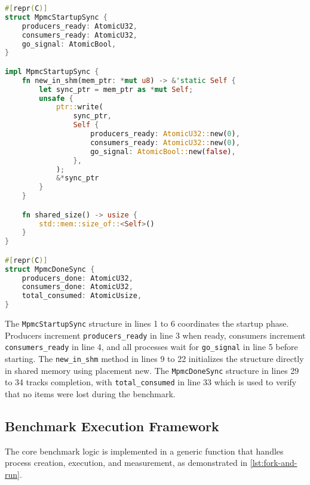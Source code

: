 \begin{lstlisting}[language=Rust, style=boxed, caption={Process synchronization structures}, label={lst:sync-structures}]
#[repr(C)]
struct MpmcStartupSync {
    producers_ready: AtomicU32,
    consumers_ready: AtomicU32,
    go_signal: AtomicBool,
}

impl MpmcStartupSync {
    fn new_in_shm(mem_ptr: *mut u8) -> &'static Self {
        let sync_ptr = mem_ptr as *mut Self;
        unsafe {
            ptr::write(
                sync_ptr,
                Self {
                    producers_ready: AtomicU32::new(0),
                    consumers_ready: AtomicU32::new(0),
                    go_signal: AtomicBool::new(false),
                },
            );
            &*sync_ptr
        }
    }

    fn shared_size() -> usize {
        std::mem::size_of::<Self>()
    }
}

#[repr(C)]
struct MpmcDoneSync {
    producers_done: AtomicU32,
    consumers_done: AtomicU32,
    total_consumed: AtomicUsize,
}
\end{lstlisting}

The \texttt{MpmcStartupSync} structure in lines 1 to 6 coordinates the startup phase. Producers increment \texttt{producers\_ready} in line 3 when ready, consumers increment \texttt{consumers\_ready} in line 4, and all processes wait for \texttt{go\_signal} in line 5 before starting. The \texttt{new\_in\_shm} method in lines 9 to 22 initializes the structure directly in shared memory using placement new. The \texttt{MpmcDoneSync} structure in lines 29 to 34 tracks completion, with \texttt{total\_consumed} in line 33 which is used to verify that no items were lost during the benchmark. 

\subsection{Benchmark Execution Framework}

The core benchmark logic is implemented in a generic function that handles process creation, execution, and measurement, as demonstrated in \cref{lst:fork-and-run}.


